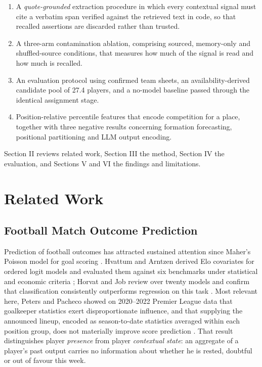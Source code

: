 \documentclass[conference]{IEEEtran}
\begin{document}
\begin{enumerate}
    \item[(i)] A \emph{quote-grounded} extraction procedure in which every contextual signal must cite a verbatim span verified against the retrieved text in code, so that recalled assertions are discarded rather than trusted.
    \item[(ii)] A three-arm contamination ablation, comprising sourced, memory-only and shuffled-source conditions, that measures how much of the signal is read and how much is recalled.
    \item[(iii)] An evaluation protocol using confirmed team sheets, an availability-derived candidate pool of 27.4 players, and a no-model baseline passed through the identical assignment stage.
    \item[(iv)] Position-relative percentile features that encode competition for a place, together with three negative results concerning formation forecasting, positional partitioning and LLM output encoding.
\end{enumerate}

Section II reviews related work, Section III the method, Section IV the evaluation, and Sections V and VI the findings and limitations.

\section{Related Work}

\subsection{Football Match Outcome Prediction}

Prediction of football outcomes has attracted sustained attention since Maher's Poisson model for goal scoring \cite{maher1982}. Hvattum and Arntzen derived Elo covariates for ordered logit models and evaluated them against six benchmarks under statistical and economic criteria \cite{hvattumarntzen2010}; Horvat and Job review over twenty models and confirm that classification consistently outperforms regression on this task \cite{horvatjob2020}. Most relevant here, Peters and Pacheco showed on 2020--2022 Premier League data that goalkeeper statistics exert disproportionate influence, and that supplying the announced lineup, encoded as season-to-date statistics averaged within each position group, does not materially improve score prediction \cite{peterspacheco2023}. That result distinguishes player \emph{presence} from player \emph{contextual state}: an aggregate of a player's past output carries no information about whether he is rested, doubtful or out of favour this week.
\end{document}
